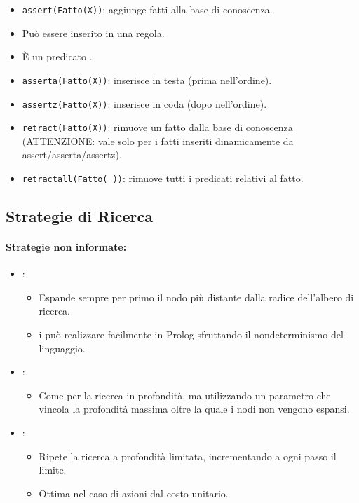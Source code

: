 \begin{itemize}
  \item \texttt{assert(Fatto(X))}: aggiunge fatti alla base di conoscenza. 
  \item Può essere inserito in una regola.
  \item È un predicato .
  \item \texttt{asserta(Fatto(X))}: inserisce in testa (prima nell'ordine). 
  \item \texttt{assertz(Fatto(X))}: inserisce in coda (dopo nell'ordine).
  \item \texttt{retract(Fatto(X))}: rimuove un fatto dalla base di conoscenza (ATTENZIONE: vale solo per i fatti inseriti dinamicamente da assert/asserta/assertz).
  \item \texttt{retractall(Fatto(\_))}: rimuove tutti i predicati relativi al fatto.
\end{itemize}

\subsection{Strategie di Ricerca}


\paragraph{Strategie non informate:}

\begin{itemize}
  \item {}: 
    \begin{itemize}
      \item Espande sempre per primo il nodo più distante dalla radice
dell’albero di ricerca. 
\item i può realizzare facilmente in Prolog sfruttando il
nondeterminismo del linguaggio. 
    \end{itemize}
  \item {}:
    \begin{itemize}
      \item Come per la ricerca in profondità, ma utilizzando un parametro
che vincola la profondità massima oltre la quale i nodi non
vengono espansi.
    \end{itemize}
  \item {}: 
    \begin{itemize}
      \item Ripete la ricerca a profondità limitata, incrementando a ogni
passo il limite. 
\item Ottima nel caso di azioni dal costo unitario.
    \end{itemize}
\end{itemize}

